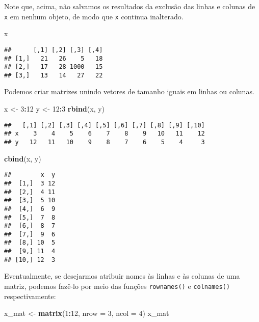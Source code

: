 \documentclass[
]{book}
\newenvironment{Shaded}{\begin{snugshade}}{\end{snugshade}}
\newcommand{\DataTypeTok}[1]{\textcolor[rgb]{0.13,0.29,0.53}{#1}}
\newcommand{\DecValTok}[1]{\textcolor[rgb]{0.00,0.00,0.81}{#1}}
\newcommand{\KeywordTok}[1]{\textcolor[rgb]{0.13,0.29,0.53}{\textbf{#1}}}
\newcommand{\NormalTok}[1]{#1}
\newcommand{\OperatorTok}[1]{\textcolor[rgb]{0.81,0.36,0.00}{\textbf{#1}}}
\newcommand{\StringTok}[1]{\textcolor[rgb]{0.31,0.60,0.02}{#1}}
\begin{document}
Note que, acima, não salvamos os resultados da exclusão das linhas e colunas de \texttt{x} em nenhum objeto, de modo que \texttt{x} continua inalterado.

\begin{Shaded}
\begin{Highlighting}[]
\NormalTok{x}
\end{Highlighting}
\end{Shaded}

\begin{verbatim}
##      [,1] [,2] [,3] [,4]
## [1,]   21   26    5   18
## [2,]   17   28 1000   15
## [3,]   13   14   27   22
\end{verbatim}

Podemos criar matrizes unindo vetores de tamanho iguais em linhas ou colunas.

\begin{Shaded}
\begin{Highlighting}[]
\NormalTok{x <-}\StringTok{ }\DecValTok{3}\OperatorTok{:}\DecValTok{12}
\NormalTok{y <-}\StringTok{ }\DecValTok{12}\OperatorTok{:}\DecValTok{3}
\KeywordTok{rbind}\NormalTok{(x, y)}
\end{Highlighting}
\end{Shaded}

\begin{verbatim}
##   [,1] [,2] [,3] [,4] [,5] [,6] [,7] [,8] [,9] [,10]
## x    3    4    5    6    7    8    9   10   11    12
## y   12   11   10    9    8    7    6    5    4     3
\end{verbatim}

\begin{Shaded}
\begin{Highlighting}[]
\KeywordTok{cbind}\NormalTok{(x, y)}
\end{Highlighting}
\end{Shaded}

\begin{verbatim}
##        x  y
##  [1,]  3 12
##  [2,]  4 11
##  [3,]  5 10
##  [4,]  6  9
##  [5,]  7  8
##  [6,]  8  7
##  [7,]  9  6
##  [8,] 10  5
##  [9,] 11  4
## [10,] 12  3
\end{verbatim}

Eventualmente, se desejarmos atribuir nomes às linhas e às colunas de uma matriz, podemos fazê-lo por meio das funções \texttt{rownames()} e \texttt{colnames()} respectivamente:

\begin{Shaded}
\begin{Highlighting}[]
\NormalTok{x_mat <-}\StringTok{ }\KeywordTok{matrix}\NormalTok{(}\DecValTok{1}\OperatorTok{:}\DecValTok{12}\NormalTok{, }\DataTypeTok{nrow =} \DecValTok{3}\NormalTok{, }\DataTypeTok{ncol =} \DecValTok{4}\NormalTok{)}
\NormalTok{x_mat}
\end{Highlighting}
\end{Shaded}
\end{document}
